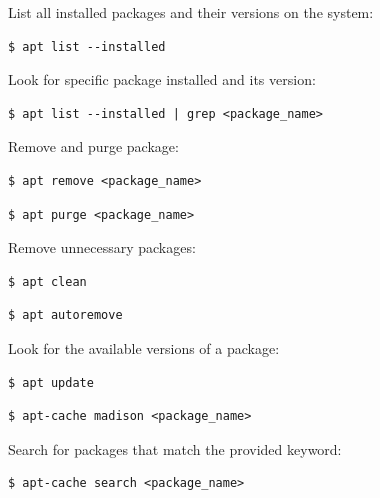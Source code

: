 \documentclass{article}
\newenvironment{codetemplate}[1][]{%
  \mybasecolorbox[#1]
  \itshape
}{%
  \endmybasecolorbox
}
\begin{document}
List all installed packages and their versions on the system:
\begin{codetemplate}
\begin{verbatim}
$ apt list --installed
\end{verbatim}
\end{codetemplate}

Look for specific package installed and its version:
\begin{codetemplate}
\begin{verbatim}
$ apt list --installed | grep <package_name>
\end{verbatim}
\end{codetemplate}

Remove and purge package:
\begin{codetemplate}
\begin{verbatim}
$ apt remove <package_name>
\end{verbatim}
\end{codetemplate}
\begin{codetemplate}
\begin{verbatim}
$ apt purge <package_name>
\end{verbatim}
\end{codetemplate}

Remove unnecessary packages:
\begin{codetemplate}
\begin{verbatim}
$ apt clean
\end{verbatim}
\end{codetemplate}
\begin{codetemplate}
\begin{verbatim}
$ apt autoremove
\end{verbatim}
\end{codetemplate}

Look for the available versions of a package:
\begin{codetemplate}
\begin{verbatim}
$ apt update
\end{verbatim}
\end{codetemplate}
\begin{codetemplate}
\begin{verbatim}
$ apt-cache madison <package_name>
\end{verbatim}
\end{codetemplate}

Search for packages that match the provided keyword:
\begin{codetemplate}
\begin{verbatim}
$ apt-cache search <package_name>
\end{verbatim}
\end{codetemplate}
\end{document}
